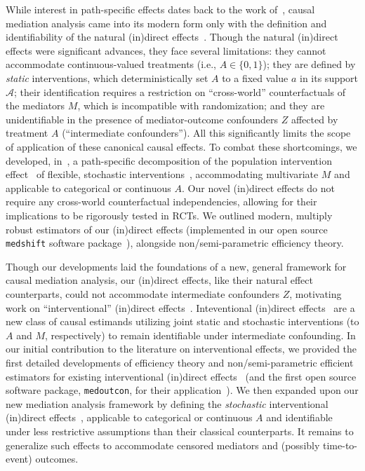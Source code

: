 While interest in path-specific effects dates back to the work
of~\citet{wright1934method}, causal mediation analysis came into its modern form
only with the definition and identifiability of the natural (in)direct
effects~\citep{robins1992identifiability, pearl2001direct}. Though the natural
(in)direct effects were significant advances, they face several limitations:
they cannot accommodate continuous-valued treatments (i.e., $A \in \{0, 1\}$);
they are defined by \textit{static} interventions, which deterministically set
$A$ to a fixed value $a$ in its support $\mathcal{A}$; their identification
requires a restriction on ``cross-world'' counterfactuals of the mediators $M$,
which is incompatible with randomization; and they are unidentifiable in the
presence of mediator-outcome confounders $Z$ affected by treatment $A$
(``intermediate confounders''). All this significantly limits the scope of
application of these canonical causal effects. To combat these shortcomings, we
developed, in~\citet{diaz2020causal}, a path-specific decomposition of the
population intervention effect~\citep{diaz2012population} of flexible,
stochastic interventions~\citep{stock1989nonparametric, diaz2013assessing,
kennedy2019nonparametric}, accommodating multivariate $M$ and applicable to
categorical or continuous $A$. Our novel (in)direct effects do not require any
cross-world counterfactual independencies, allowing for their implications to be
rigorously tested in RCTs. We outlined modern, multiply robust estimators of our
(in)direct effects (implemented in our open source \texttt{medshift} software
package~\citep{hejazi2020medshift}), alongside non/semi-parametric efficiency
theory.

Though our developments laid the foundations of a new, general framework for
causal mediation analysis, our (in)direct effects, like their natural effect
counterparts, could not accommodate intermediate confounders $Z$, motivating
work on ``interventional'' (in)direct effects~\citep{diaz2020nonparametric,
hejazi2020nonparametric}. Inteventional (in)direct
effects~\citep{vanderweele2014effect, vansteelandt2017interventional} are a new
class of causal estimands utilizing joint static and stochastic interventions
(to $A$ and $M$, respectively) to remain identifiable under intermediate
confounding. In our initial contribution to the literature on interventional
effects, we provided the first detailed developments of efficiency theory and
non/semi-parametric efficient estimators for existing interventional (in)direct
effects~\citep{diaz2020nonparametric} (and the first open source software
package, \texttt{medoutcon}, for their application~\citep{hejazi2021medoutcon}).
We then expanded upon our new mediation analysis framework by defining the
\textit{stochastic} interventional (in)direct
effects~\citep{hejazi2020nonparametric}, applicable to categorical or continuous
$A$ and identifiable under less restrictive assumptions than their classical
counterparts. It remains to generalize such effects to accommodate censored
mediators and (possibly time-to-event) outcomes.


